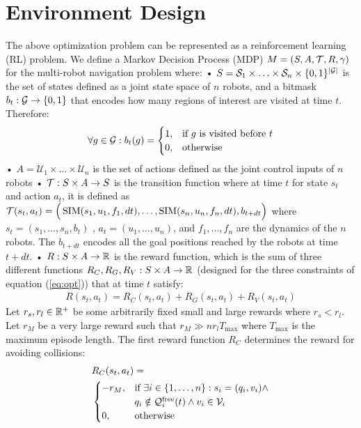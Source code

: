 \documentclass{article}
\begin{document}
\section{Environment Design}
\label{sec:mdp_theory}
The above optimization problem can be represented as a reinforcement learning (RL) problem. We define a Markov Decision Process (MDP) $M = (S, A, \mathcal{T}, R, \gamma)$ for the multi-robot navigation problem where:
• $S = \mathcal{S}_1 \times \ldots \times \mathcal{S}_n \times \{0, 1 \}^{|\mathcal{G}|}$ is the set of states defined as a joint state space of $n$ robots, and a bitmask $b_t: \mathcal{G} \to \{0, 1\}$ that encodes how many regions of interest are visited at time $t$. Therefore: 
\begin{equation}
\forall g \in \mathcal{G}: b_t(g) =
\begin{cases}
    1, &\text{if $g$ is visited before $t$} \\
    0, &\text{otherwise}
\end{cases}
\end{equation}
• $A = \mathcal{U}_1 \times \ldots \times \mathcal{U}_n$ is the set of actions defined as the joint control inputs of $n$ robots
• $\mathcal{T}: S \times A \to S$ is the transition function where at time $t$ for state $s_t$ and action $a_t$, it is defined as $\mathcal{T}(s_t,a_t) = \Big( \operatorname{SIM}(s_1,u_1,f_1,dt), \ldots , \operatorname{SIM}(s_n,u_n,f_n,dt), b_{t+dt} \Big)$ where $s_t = (s_1,\ldots,s_n, b_t)$ , $a_t = (u_1,\ldots,u_n)$, and $f_1,\ldots, f_n$ are the dynamics of the $n$ robots. The $b_{t+dt}$ encodes all the goal positions reached by the robots at time $t+dt$.
• $R: S \times A \to \mathbb{R}$ is the reward function, which is the sum of three different functions $R_C, R_G, R_V: S \times A \to \mathbb{R}$ (designed for the three constraints of equation (\ref{eq:opt})) that at time $t$ satisfy:
\begin{align}
\label{eq:reward}
    R(s_t,a_t) = R_C(s_t,a_t) + R_G(s_t,a_t) + R_V (s_t,a_t)
\end{align}
Let $r_s, r_l \in \mathbb{R}^+$ be some arbitrarily fixed small and large rewards where $r_s < r_l$. Let $r_M$ be a very large reward such that $r_M \gg nr_lT_{\max} $ where $T_{\max}$ is the maximum episode length. The first reward function $R_C$ determines the reward for avoiding collisions:
\begin{align}
\label{eq:reward_c}
& R_C(s_t, a_t) = \hfill \nonumber \\
& \begin{cases}
    -r_M, &\text{if } \exists i \in \{1,\ldots,n\}: s_i = (q_i, v_i) \land \\
          & q_i \notin \config_i^{\free}(t) \land v_i \in \mathcal{V}_i \\
    0,    &\text{otherwise}
\end{cases}
\end{align}
\end{document}
